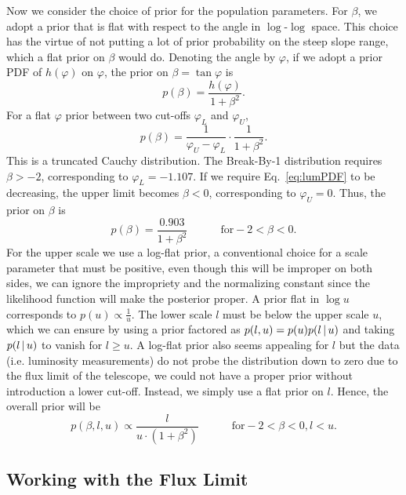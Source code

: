 Now we consider the choice of prior for the population parameters.
For $\beta$, we adopt a prior that is flat with respect to the angle in $\log$-$\log$ space.
This choice has the virtue of not putting a lot of prior probability on the steep slope range, which a flat prior on $\beta$ would do.
Denoting the angle by $\varphi$, if we adopt a prior PDF of $h(\varphi)$ on $\varphi$, the prior on $\beta = \tan\varphi$ is
\begin{equation}
	p(\beta) = \frac{h(\varphi)}{1 + \beta^2}.
\end{equation}
For a flat $\varphi$ prior between two cut-offs $\varphi_L$ and $\varphi_U$,
\begin{equation}
	p(\beta) = \frac{1}{\varphi_U - \varphi_L} \cdot \frac{1}{1 + \beta^2}.
\end{equation}
This is a truncated Cauchy distribution.
The Break-By-1 distribution requires $\beta > -2$, corresponding to $\varphi_L = -1.107$.
If we require Eq.~\ref{eq:lumPDF} to be decreasing, the upper limit becomes $\beta < 0$, corresponding to $\varphi_U = 0$.
Thus, the prior on $\beta$ is
\begin{equation}
p(\beta) = \frac{0.903}{1 + \beta^2} \quad \quad \quad \textrm{for} -2 < \beta < 0.
\end{equation}
For the upper scale we use a log-flat prior, a conventional choice for a scale parameter that must be positive, even though this will be improper on both sides, we can ignore the impropriety and the normalizing constant since the likelihood function will make the posterior proper.
A prior flat in $\log{u}$ corresponds to $p(u) \propto \frac{1}{u}$.
The lower scale $l$ must be below the upper scale $u$, which we can ensure by using a prior factored as $p(l, u) = p(u) p(l \,|\, u)$ and taking $p(l \,|\, u)$ to vanish for $l \geq u$.
A log-flat prior also seems appealing for $l$ but the data (i.e. luminosity measurements) do not probe the distribution down to zero due to the flux limit of the telescope, we could not have a proper prior without introduction a lower cut-off.
Instead, we simply use a flat prior on $l$.
Hence, the overall prior will be \begin{equation}\label{eq:popParsPriorPDF} p(\beta, l, u) \propto \frac{l}{u \cdot (1 + \beta^2)} \quad\quad\quad \textrm{for} -2 < \beta < 0, l < u.
\end{equation}

\subsection{Working with the Flux Limit}
\label{sec:sel_effect}

